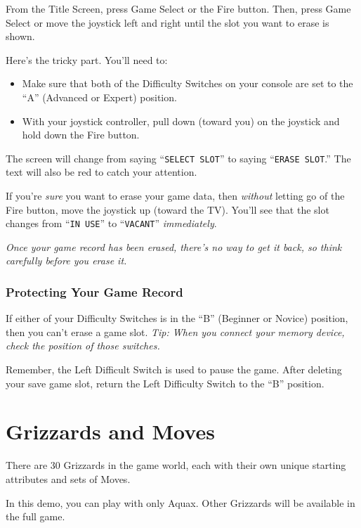 \documentclass[10pt,twocolumn,openany,article]{memoir}
\begin{document}
\begin{description}
From the Title Screen, press Game Select or the Fire button. Then, press
Game Select or move the joystick left  and right until the slot you want
to erase is shown.

Here's the tricky part. You'll need to:

\begin{itemize}
\item Make sure that both of the Difficulty Switches on your console
  are set to the ``A'' (Advanced or Expert) position.
\item With your joystick controller, pull down (toward you) on the
  joystick and hold down the Fire button.
\end{itemize}

The screen  will change from  saying ``\texttt{SELECT SLOT}''  to saying
``\texttt{ERASE  SLOT}.''   The  text   will  also   be  red   to  catch
your attention.

If  you're  \emph{sure}   you  want  to  erase  your   game  data,  then
\emph{without}  letting go  of the  Fire  button, move  the joystick  up
(toward  the TV).  You'll see  that the  slot changes  from ``\texttt{IN
  USE}'' to ``\texttt{VACANT}'' \emph{immediately}.

\emph{Once your  game record has been  erased, there's no way  to get it
  back, so think carefully before you erase it.}

\subsection{Protecting Your Game Record}

If  either of  your Difficulty  Switches is  in the  ``B'' (Beginner  or
Novice) position, then you can't erase  a game slot. \emph{Tip: When you
  connect your memory device, check the position of those switches.}

\ifdefined\TVSECAM
Remember,  the  Left  Difficult  Switch  is  used  to  pause  the  game.
After deleting your save game slot, return the Left Difficulty Switch to
the ``B'' position.
\fi

\chapter{Grizzards and Moves}

There are  30 Grizzards in  the game world,  each with their  own unique
starting attributes and sets of Moves.

\ifdefined\DEMO

In this  demo, you  can play  with only Aquax.  Other Grizzards  will be
available in the full game.


\end{description}
\end{document}
